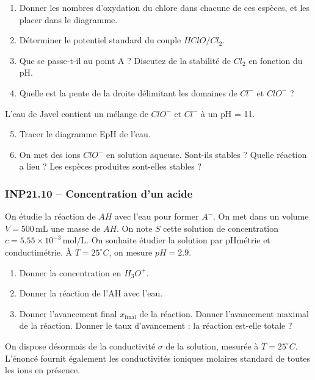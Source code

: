 \begin{enumerate}
    \item Donner les nombres d'oxydation du chlore dans chacune de ces espèces, et les placer dans le diagramme.
    \item Déterminer le potentiel standard du couple $HClO/Cl_2$.
    \item Que se passe-t-il au point A ? Discutez de la stabilité de $Cl_2$ en fonction du pH.
    \item Quelle est la pente de la droite délimitant les domaines de $Cl^-$ et $ClO^-$ ?
\end{enumerate}

L'eau de Javel contient un mélange de $ClO^-$ et $Cl^-$ à un pH = 11.

\begin{enumerate}
    \setcounter{enumi}{4}
    \item Tracer le diagramme EpH de l'eau.
    \item On met des ions $ClO^-$ en solution aqueuse. Sont-ils stables ? Quelle réaction a lieu ? Les espèces produites sont-elles stables ?
\end{enumerate}

\subsubsection*{INP21.10 -- Concentration d'un acide \corrige}

On étudie la réaction de $AH$ avec l'eau pour former $A^-$. On met dans un volume $V = 500\, \text{mL}$ une masse de $AH$. On note $S$ cette solution de concentration $c = 5.55 \times 10^{-3}\, \text{mol/L}$. On souhaite étudier la solution par pHmétrie et conductimétrie. À $T = 25^\circ C$, on mesure $pH = 2.9$.

\begin{enumerate}
    \item Donner la concentration en $H_3O^+$.
    \item Donner la réaction de l'AH avec l'eau.
    \item Donner l'avancement final $x_{\text{final}}$ de la réaction. Donner l'avancement maximal de la réaction. Donner le taux d'avancement : la réaction est-elle totale ?
\end{enumerate}

On dispose désormais de la conductivité $\sigma$ de la solution, mesurée à $T = 25^\circ C$. L'énoncé fournit également les conductivités ioniques molaires standard de toutes les ions en présence.

